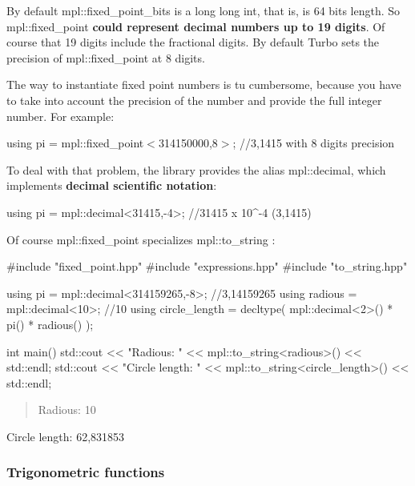 By default {\ttfamily mpl\+::fixed\+\_\+point\+\_\+bits} is a {\ttfamily long long int}, that is, is 64 bits length. So {\ttfamily mpl\+::fixed\+\_\+point} {\bfseries could represent decimal numbers up to 19 digits}. Of course that 19 digits include the fractional digits. By default Turbo sets the precision of {\ttfamily mpl\+::fixed\+\_\+point} at 8 digits.

The way to instantiate fixed point numbers is tu cumbersome, because you have to take into account the precision of the number and provide the full integer number. For example\+:

using pi = mpl\+::fixed\+\_\+point$<$314150000,8$>$; //3,1415 with 8 digits precision

To deal with that problem, the library provides the alias {\ttfamily mpl\+::decimal}, which implements {\bfseries decimal scientific notation}\+: \begin{DoxyVerb}using pi = mpl::decimal<31415,-4>; //31415 x 10^-4 (3,1415)
\end{DoxyVerb}


Of course {\ttfamily mpl\+::fixed\+\_\+point} specializes {\ttfamily mpl\+::to\+\_\+string} \+: \begin{DoxyVerb}#include "fixed_point.hpp"
#include "expressions.hpp"
#include "to_string.hpp"

using pi      = mpl::decimal<314159265,-8>; //3,14159265
using radious = mpl::decimal<10>; //10
using circle_length = decltype( mpl::decimal<2>() * pi() * radious() );

int main()
{
 std::cout << "Radious: " << mpl::to_string<radious>() << std::endl;
 std::cout << "Circle length: " << mpl::to_string<circle_length>() << std::endl;
}
\end{DoxyVerb}
 \begin{quote}
Radious\+: 10 \end{quote}
Circle length\+: 62,831853

\subsubsection*{Trigonometric functions}

